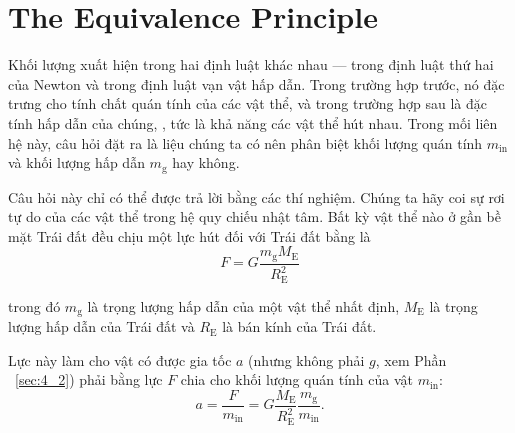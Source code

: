 \section{The Equivalence Principle}\label{sec:6_3}

Khối lượng xuất hiện trong hai định luật khác nhau --- trong định luật thứ hai của Newton và trong định luật vạn vật hấp dẫn. Trong trường hợp trước, nó đặc trưng cho tính chất quán tính của các vật thể, và trong trường hợp sau là đặc tính hấp dẫn của chúng, \ie, tức là khả năng các vật thể hút nhau. Trong mối liên hệ này, câu hỏi đặt ra là liệu chúng ta có nên phân biệt khối lượng quán tính $m_{\text{in}}$ và khối lượng hấp dẫn $m_{\text{g}}$ hay không.

Câu hỏi này chỉ có thể được trả lời bằng các thí nghiệm. Chúng ta hãy coi sự rơi tự do của các vật thể trong hệ quy chiếu nhật tâm. Bất kỳ vật thể nào ở gần bề mặt Trái đất đều chịu một lực hút đối với Trái đất bằng  là
\begin{equation*}
	F = G\frac{m_{\text{g}} M_{\text{E}}}{R_{\text{E}}^2}
\end{equation*}

\noindent
trong đó $m_{\text{g}}$ là trọng lượng hấp dẫn của một vật thể nhất định, $M_{\text{E}}$ là trọng lượng hấp dẫn của Trái đất và $R_{\text{E}}$ là bán kính của Trái đất.

Lực này làm cho vật có được gia tốc $a$ (nhưng không phải $g$, xem Phần ~\ref{sec:4_2}) phải bằng lực $F$ chia cho khối lượng quán tính của vật $m_{\text{in}}$:
\begin{equation}\label{eq:6_20}
	a = \frac{F}{m_{\text{in}}} = G\frac{M_{\text{E}}}{R_{\text{E}}^2}\frac{m_{\text{g}}}{m_{\text{in}}}.
\end{equation}

